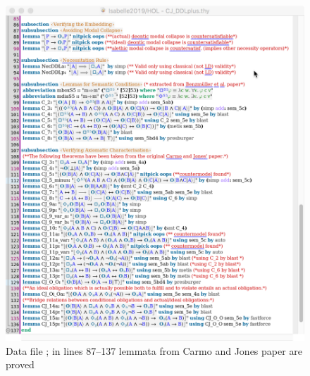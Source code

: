 \documentclass{article}
\begin{document}
\begin{figure}[ht!]
 \includegraphics[width=\textwidth]{CJ_DDLplus2.png}
\caption{Data file \textsf{\small {}; in
    lines 87--137 lemmata from Carmo and Jones paper \cite{CJ13} are
    proved \label{fig:CJ_DDLplus2}}}
\end{figure}
\end{document}

